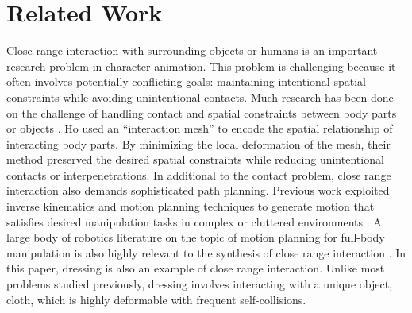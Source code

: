 \section{Related Work}

Close range interaction with surrounding objects or humans is an important research problem in character animation. This problem is challenging because it often involves potentially conflicting goals: maintaining intentional spatial constraints while avoiding unintentional contacts. Much research has been done on the challenge of handling contact and spatial constraints between body parts or objects \cite{Gleicher:1998:RMN,Liu:2006:CCO,Ho:2009:CMS,Kim:2009:SMM,Ho:2010:SRP}. Ho \etal {} used an ``interaction mesh'' to encode the spatial relationship of interacting body parts. By minimizing the local deformation of the mesh, their method preserved the desired spatial constraints while reducing unintentional contacts or interpenetrations. In additional to the contact problem, close range interaction also demands sophisticated path planning. Previous work exploited inverse kinematics and motion planning techniques to generate motion that satisfies desired manipulation tasks in complex or cluttered environments \cite{Kallmann:2003:PCF,Yamane:2004:SAH}. A large body of robotics literature on the topic of motion planning for full-body manipulation is also highly relevant to the synthesis of close range interaction \cite{Harada:2003:PMH,Takubo:2005:PAO,Yoshida:2005:HMP,Nishiwaki:2006:MCS}. In this paper, dressing is also an example of close range interaction. Unlike most problems studied previously, dressing involves interacting with a unique object, cloth, which is highly deformable with frequent self-collisions. 

